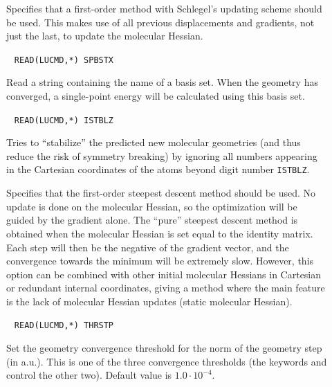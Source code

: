 \begin{description}
\item[]
Specifies that a first-order method
with Schlegel's updating scheme
\cite{Schlegel} should be used. This makes use of all previous
displacements and gradients, not just the last, to update the
molecular Hessian.

\item[]\verb| | \newline
\verb|READ(LUCMD,*) SPBSTX|

Read a string containing the name of a basis set. When the geometry
has converged, a single-point energy will be calculated using this
basis set.

\item[]\verb| | \newline
\verb|READ(LUCMD,*) ISTBLZ|

Tries to ``stabilize'' the predicted new molecular geometries (and
thus reduce the risk of symmetry breaking) by ignoring all numbers
appearing in the Cartesian coordinates of the atoms beyond digit
number \verb|ISTBLZ|.

\item[]
Specifies that the first-order steepest descent
 method should be used.
No update is done on the molecular Hessian, so the optimization will be
guided by the gradient alone. The ``pure'' steepest descent method is
obtained when the molecular Hessian is set equal to the identity matrix. Each
step will then be the negative of the gradient vector, and the
convergence towards the minimum will be extremely slow. However, this
option can be combined with other initial molecular Hessians in Cartesian or
redundant internal coordinates,
giving a method where the main feature is the lack of molecular Hessian updates (static molecular Hessian).

\item[]\verb| | \newline
\verb|READ(LUCMD,*) THRSTP|

Set the geometry convergence threshold for
the norm of the geometry step (in a.u.).
This is one of the three convergence thresholds (the keywords  and
 control the other two). Default value is $1.0\cdot
10^{-4}$.


\end{description}
